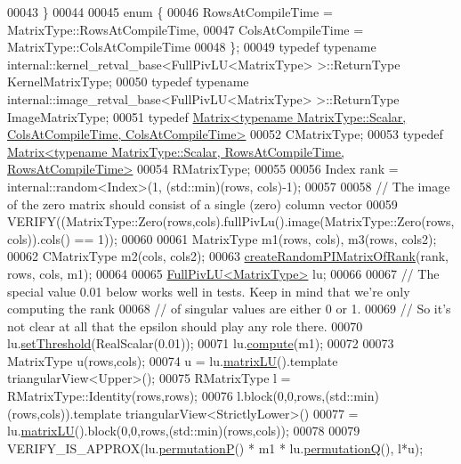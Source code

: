 \begin{DoxyCode}
00043   \}
00044 
00045   \textcolor{keyword}{enum} \{
00046     RowsAtCompileTime = MatrixType::RowsAtCompileTime,
00047     ColsAtCompileTime = MatrixType::ColsAtCompileTime
00048   \};
00049   \textcolor{keyword}{typedef} \textcolor{keyword}{typename} internal::kernel\_retval\_base<FullPivLU<MatrixType> >::ReturnType KernelMatrixType;
00050   \textcolor{keyword}{typedef} \textcolor{keyword}{typename} internal::image\_retval\_base<FullPivLU<MatrixType> >::ReturnType ImageMatrixType;
00051   \textcolor{keyword}{typedef} 
      \hyperlink{group___core___module_class_eigen_1_1_matrix}{Matrix<typename MatrixType::Scalar, ColsAtCompileTime, ColsAtCompileTime>}
00052           CMatrixType;
00053   \textcolor{keyword}{typedef} 
      \hyperlink{group___core___module_class_eigen_1_1_matrix}{Matrix<typename MatrixType::Scalar, RowsAtCompileTime, RowsAtCompileTime>}
00054           RMatrixType;
00055 
00056   Index rank = internal::random<Index>(1, (std::min)(rows, cols)-1);
00057 
00058   \textcolor{comment}{// The image of the zero matrix should consist of a single (zero) column vector}
00059   VERIFY((MatrixType::Zero(rows,cols).fullPivLu().image(MatrixType::Zero(rows,cols)).cols() == 1));
00060 
00061   MatrixType m1(rows, cols), m3(rows, cols2);
00062   CMatrixType m2(cols, cols2);
00063   \hyperlink{namespace_eigen_a0d9a7ddcee5c7c8defaba3628455efb2}{createRandomPIMatrixOfRank}(rank, rows, cols, m1);
00064 
00065   \hyperlink{group___l_u___module_class_eigen_1_1_full_piv_l_u}{FullPivLU<MatrixType>} lu;
00066 
00067   \textcolor{comment}{// The special value 0.01 below works well in tests. Keep in mind that we're only computing the rank}
00068   \textcolor{comment}{// of singular values are either 0 or 1.}
00069   \textcolor{comment}{// So it's not clear at all that the epsilon should play any role there.}
00070   lu.\hyperlink{group___l_u___module_a414592d82de98f5bd075965caf56d681}{setThreshold}(RealScalar(0.01));
00071   lu.\hyperlink{group___l_u___module_a0a3c3b1bbafa31a03567a4573ebabc79}{compute}(m1);
00072 
00073   MatrixType u(rows,cols);
00074   u = lu.\hyperlink{group___l_u___module_afea0b8fc707a9097d46fe358cb18bbff}{matrixLU}().template triangularView<Upper>();
00075   RMatrixType l = RMatrixType::Identity(rows,rows);
00076   l.block(0,0,rows,(std::min)(rows,cols)).template triangularView<StrictlyLower>()
00077     = lu.\hyperlink{group___l_u___module_afea0b8fc707a9097d46fe358cb18bbff}{matrixLU}().block(0,0,rows,(std::min)(rows,cols));
00078 
00079   VERIFY\_IS\_APPROX(lu.\hyperlink{group___l_u___module_a09274c82240f6441af5e6c99e24e756d}{permutationP}() * m1 * lu.\hyperlink{group___l_u___module_a8d18190c7618de271cba7293f0493a36}{permutationQ}(), l*u);

\end{DoxyCode}

